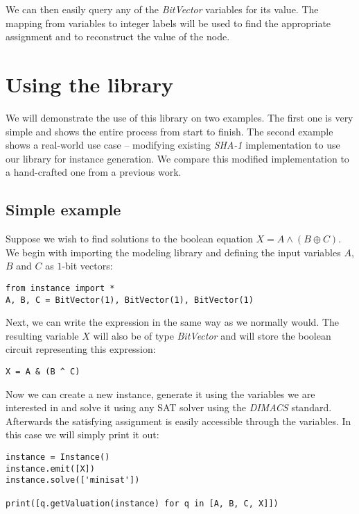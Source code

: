 We can then easily query any of the \emph{BitVector} variables for its value.
The mapping from variables to integer labels will be used to find the appropriate assignment and to reconstruct the value of the node.

\section{Using the library}
We will demonstrate the use of this library on two examples.
The first one is very simple and shows the entire process from start to finish.
The second example shows a real-world use case -- modifying existing \emph{SHA-1} implementation to use our library for instance generation.
We compare this modified implementation to a hand-crafted one from a previous work.

\subsection{Simple example}
Suppose we wish to find solutions to the boolean equation $X = A \land (B \oplus C)$.
We begin with importing the modeling library and defining the input variables $A$,$B$ and $C$ as $1$-bit vectors:
\begin{verbatim}
from instance import *
A, B, C = BitVector(1), BitVector(1), BitVector(1)
\end{verbatim}

Next, we can write the expression in the same way as we normally would.
The resulting variable $X$ will also be of type \emph{BitVector} and will store the boolean circuit representing this expression:
\begin{verbatim}
X = A & (B ^ C)
\end{verbatim}

Now we can create a new instance, generate it using the variables we are interested in and solve it using any SAT solver using the \emph{DIMACS} standard.
Afterwards the satisfying assignment is easily accessible through the variables.
In this case we will simply print it out:

\begin{verbatim}
instance = Instance()
instance.emit([X])
instance.solve(['minisat'])

print([q.getValuation(instance) for q in [A, B, C, X]])
\end{verbatim}


